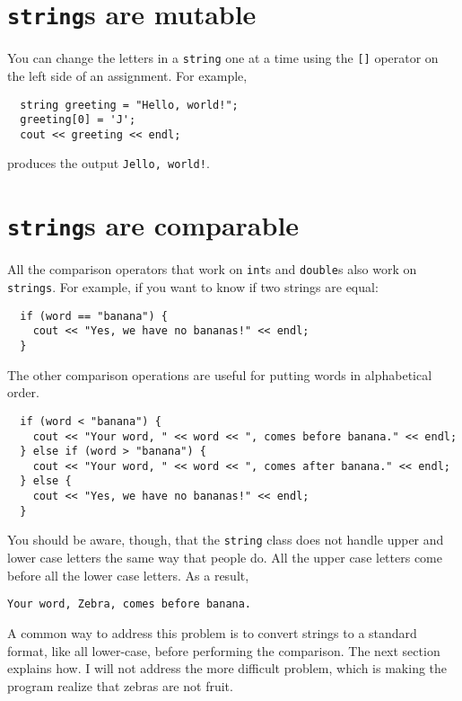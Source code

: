 \section{{\tt string}s are mutable}

You can change the letters in a {\tt string} one at a time
using the {\tt []} operator on the left side of an assignment.
For example,

\begin{verbatim}
  string greeting = "Hello, world!";
  greeting[0] = 'J';
  cout << greeting << endl;
\end{verbatim}
%
produces the output {\tt Jello, world!}.


\section{{\tt string}s are comparable}
\label{incomparable}

All the comparison operators that work on {\tt int}s and
{\tt double}s also work on {\tt strings}.  For example,
if you want to know if two strings are equal:

\begin{verbatim}
  if (word == "banana") {
    cout << "Yes, we have no bananas!" << endl;
  }
\end{verbatim}
%
The other comparison operations are useful for putting words
in alphabetical order.

\begin{verbatim}
  if (word < "banana") {
    cout << "Your word, " << word << ", comes before banana." << endl;
  } else if (word > "banana") {
    cout << "Your word, " << word << ", comes after banana." << endl;
  } else {
    cout << "Yes, we have no bananas!" << endl;
  }
\end{verbatim}
%
You should be aware, though, that the {\tt string} class does
not handle upper and lower case letters the same way that people
do.  All the upper case letters come before all the lower case
letters.  As a result,

\begin{verbatim}
Your word, Zebra, comes before banana.
\end{verbatim}
%
A common way to address this problem is to convert strings to a
standard format, like all lower-case, before performing the
comparison.  The next section explains how.  I will not address the
more difficult problem, which is making the program realize that
zebras are not fruit.

